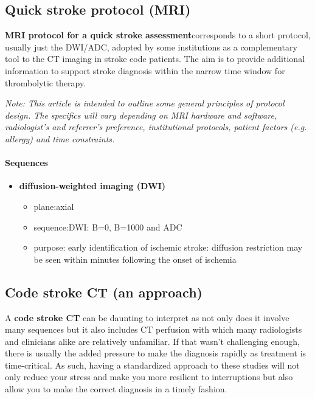\subsection{Quick stroke protocol (MRI)}

\textbf{MRI protocol for a quick stroke assessment}corresponds to a short protocol, usually just the DWI/ADC, adopted by some institutions as a complementary tool to the CT imaging in stroke code patients. The aim is to provide additional information to support stroke diagnosis within the narrow time window for thrombolytic therapy.

\emph{Note: This article is intended to outline some general principles of protocol design. The specifics will vary depending on MRI hardware and software, radiologist's and referrer's preference, institutional protocols, patient factors (e.g. allergy) and time constraints.}

\paragraph{\texorpdfstring{Sequences\textbf{\hspace{0pt}\hspace{0pt}}}{Sequences\hspace{0pt}\hspace{0pt}}}

\begin{itemize}
	\tightlist
	\item
	\textbf{diffusion-weighted imaging (DWI)}
	
	\begin{itemize}
		\tightlist
		\item
		plane:axial
		\item
		sequence:DWI: B=0, B=1000 and ADC
		\item
		purpose: early identification of ischemic stroke: diffusion restriction may be seen within minutes following the onset of ischemia 
	\end{itemize}
\end{itemize}

\subsection{Code stroke CT (an approach)}

A \textbf{code stroke CT} can be daunting to interpret as not only does it involve many sequences but it also includes CT perfusion with which many radiologists and clinicians alike are relatively unfamiliar. If that wasn't challenging enough, there is usually the added pressure to make the diagnosis rapidly as treatment is time-critical. As such, having a standardized approach to these studies will not only reduce your stress and make you more resilient to interruptions but also allow you to make the correct diagnosis in a timely fashion.

